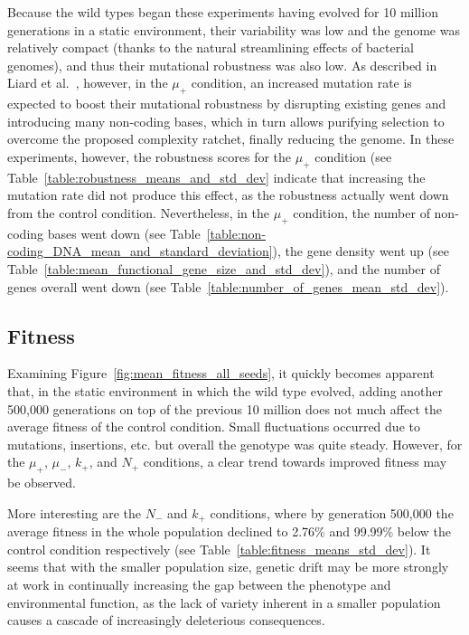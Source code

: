 Because the wild types began these experiments having evolved for 10 million generations in a static environment, their variability was low and the genome was relatively compact (thanks to the natural streamlining effects of bacterial genomes), and thus their mutational robustness was also low. As described in Liard et al.~\cite{Liard.2018}, however, in the $\mu_+$ condition, an increased mutation rate is expected to boost their mutational robustness by disrupting existing genes and introducing many non-coding bases, which in turn allows purifying selection to overcome the proposed complexity ratchet, finally reducing the genome. In these experiments, however, the robustness scores for the $\mu_+$ condition (see Table~\ref{table:robustness_means_and_std_dev} indicate that increasing the mutation rate did not produce this effect, as the robustness actually went down from the control condition. Nevertheless, in the $\mu_+$ condition, the number of non-coding bases went down (see Table~\ref{table:non-coding_DNA_mean_and_standard_deviation}), the gene density went up (see Table~\ref{table:mean_functional_gene_size_and_std_dev}), and the number of genes overall went down (see Table~\ref{table:number_of_genes_mean_std_dev}). %

\subsection{Fitness}
Examining Figure~\ref{fig:mean_fitness_all_seeds}, it quickly becomes apparent that, in the static environment in which the wild type evolved, adding another 500,000 generations on top of the previous 10 million does not much affect the average fitness of the control condition. Small fluctuations occurred due to mutations, insertions, etc. but overall the genotype was quite steady. However, for the $\mu_+$, $\mu_-$, $k_+$, and $N_+$ conditions, a clear trend towards improved fitness may be observed.

More interesting are the $N_-$ and $k_+$ conditions, where by generation 500,000 the average fitness in the whole population declined to 2.76\% and 99.99\% below the control condition respectively (see Table~\ref{table:fitness_means_std_dev}). It seems that with the smaller population size, genetic drift may be more strongly at work in continually increasing the gap between the phenotype and environmental function, as the lack of variety inherent in a smaller population causes a cascade of increasingly deleterious consequences.
 
